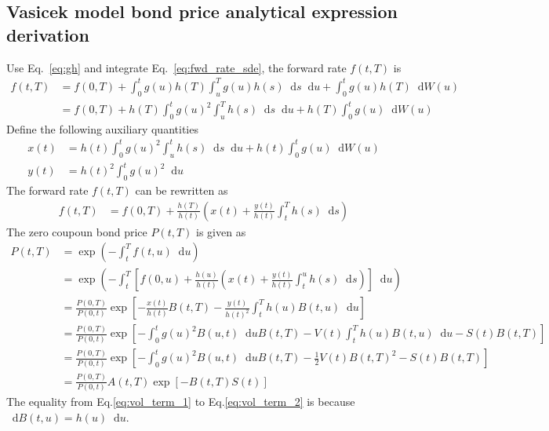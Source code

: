 \documentclass[12pt]{article}
\newcommand{\dd}{\mathop{}\!\text{d}}
\newcommand{\qBrownian}[1]{W(#1)}
\begin{document}
\begin{appendices}
\subsection{Vasicek model bond price analytical expression derivation}
Use Eq.~\ref{eq:gh} and integrate Eq.~\ref{eq:fwd_rate_sde}, the forward rate
$f(t, T)$ is
\begin{align}
    \nonumber
    f(t, T) &= f(0, T) + \int_0^t g(u) h(T) \int_u^T g(u) h(s) \dd s \dd u
        + \int_0^t g(u) h(T) \dd W(u) \\
        &= f(0, T) + h(T) \int_0^t g(u)^2 \int_u^T  h(s) \dd s \dd u
        + h(T)\int_0^t g(u)  \dd W(u) 
\end{align}
Define the following auxiliary quantities
\begin{align}
    x(t) &= h(t) \int_0^t g(u)^2 \int_u^t h(s) \dd s \dd u + h(t) \int_0^t g(u) \dd \qBrownian{u} \\
    y(t) &= h(t)^2 \int_0^t g(u)^2 \dd u
\end{align}
The forward rate $f(t, T)$ can be rewritten as
\begin{align}
    f(t,T) &= f(0, T) + \frac{h(T)}{h(t)}
        \left(
            x(t) + \frac{y(t)}{h(t)} \int_t^T h(s) \dd s 
        \right)
\end{align}
The zero coupoun bond price $P(t, T)$ is given as
\begin{align}
    P(t, T) &= \exp \left( -\int_t^T f(t, u) \dd u \right) \\
        &=\exp \left( 
            -\int_t^T \left[ 
                f(0,u) + \frac{h(u)}{h(t)} \left(
                    x(t) + \frac{y(t)}{h(t)} \int_t^u h(s) \dd s
                    \right)
            \right] \dd u
        \right) \\
        &=\frac{P(0,T)}{P(0,t)} \exp \left[
            -\frac{x(t)}{h(t)} B(t,T) - \frac{y(t)}{h(t)^2} \int_t^T h(u) B(t, u) \dd u 
        \right] \\
        \label{eq:vol_term_1}
        &=\frac{P(0,T)}{P(0,t)} \exp \left[
            -\int_0^t g(u)^2 B(u, t) \dd u B(t,T) - V(t) \int_t^T h(u) B(t, u) \dd u
            -S(t) B(t,T)
        \right] \\
        \label{eq:vol_term_2}
        &=\frac{P(0,T)}{P(0,t)} \exp \left[
            -\int_0^t g(u)^2 B(u, t) \dd u B(t,T) - \frac{1}{2} V(t) B(t, T)^2 
            -S(t) B(t,T)
        \right] \\
        \label{eq:bond_price_start}
        &=\frac{P(0, T)}{P(0, t)} A(t,T) \exp\left[-B(t,T) S(t)\right]
\end{align}
The equality from Eq.\ref{eq:vol_term_1} to Eq.\ref{eq:vol_term_2} is because
$\dd B(t,u) = h(u) \dd u$. 


\end{appendices}
\end{document}
